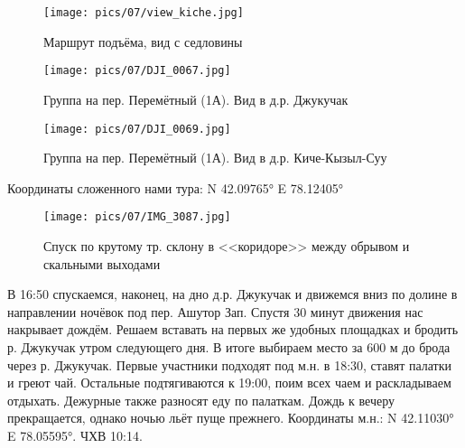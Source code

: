 \begin{figure}[h!]
	\centering
	\texttt{[image: pics/07/view\_kiche.jpg]}
	\caption{Маршрут подъёма, вид с седловины}
	\label{fig:view_kiche.jpg}
\end{figure}

\begin{figure}[h!]
	\centering
	\texttt{[image: pics/07/DJI\_0067.jpg]}
	\caption{Группа на пер. Перемётный (1А). Вид в д.р. Джукучак}
	\label{fig:DJI_0067.jpg}
\end{figure}

\begin{figure}[h!]
	\centering
	\texttt{[image: pics/07/DJI\_0069.jpg]}
	\caption{Группа на пер. Перемётный (1А). Вид в д.р. Киче-Кызыл-Суу}
	\label{fig:DJI_0069.jpg}
\end{figure}

Координаты сложенного нами тура: N 42.09765° E 78.12405°



\begin{figure}[h!]
	\centering
	\texttt{[image: pics/07/IMG\_3087.jpg]}
	\caption{Спуск по крутому тр. склону в <<коридоре>> между обрывом и скальными  выходами}
	\label{fig:IMG_3087.jpg}
\end{figure}


В 16:50 спускаемся, наконец, на дно д.р. Джукучак и движемся вниз по долине в направлении ночёвок под пер. Ашутор Зап. Спустя 30 минут движения нас накрывает дождём. Решаем вставать на первых же удобных площадках и бродить р. Джукучак утром следующего дня. В итоге выбираем место за 600 м до брода через р. Джукучак. Первые участники подходят под м.н. в 18:30, ставят палатки и греют чай. Остальные подтягиваются к 19:00, поим всех чаем и раскладываем отдыхать. Дежурные также разносят еду по палаткам. Дождь к вечеру прекращается, однако ночью льёт пуще прежнего.
Координаты м.н.: N 42.11030° E 78.05595°. ЧХВ 10:14.

\clearpage